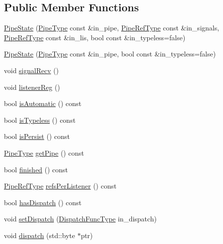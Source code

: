\subsection*{Public Member Functions}
\begin{DoxyCompactItemize}
\item 
\hyperlink{structvt_1_1pipe_1_1_pipe_state_ae243864cd9ea61ddc564b6b3a0870eb4}{Pipe\+State} (\hyperlink{namespacevt_ac9852acda74d1896f48f406cd72c7bd3}{Pipe\+Type} const \&in\+\_\+pipe, \hyperlink{namespacevt_ace18d74dd489d9ea506d38789fffce34}{Pipe\+Ref\+Type} const \&in\+\_\+signals, \hyperlink{namespacevt_ace18d74dd489d9ea506d38789fffce34}{Pipe\+Ref\+Type} const \&in\+\_\+lis, bool const \&in\+\_\+typeless=false)
\item 
\hyperlink{structvt_1_1pipe_1_1_pipe_state_a2f6a2a7f657b0938d0214fc16b65969c}{Pipe\+State} (\hyperlink{namespacevt_ac9852acda74d1896f48f406cd72c7bd3}{Pipe\+Type} const \&in\+\_\+pipe, bool const \&in\+\_\+typeless=false)
\item 
void \hyperlink{structvt_1_1pipe_1_1_pipe_state_a3cd72e7d91b3752e2cb19bc42b7de397}{signal\+Recv} ()
\item 
void \hyperlink{structvt_1_1pipe_1_1_pipe_state_acfbe1dc3cac73153543a394b4f8add35}{listener\+Reg} ()
\item 
bool \hyperlink{structvt_1_1pipe_1_1_pipe_state_ada2a4221edc09264da146ff158e37d3c}{is\+Automatic} () const
\item 
bool \hyperlink{structvt_1_1pipe_1_1_pipe_state_a0e20b860728e1aded738be02074c5861}{is\+Typeless} () const
\item 
bool \hyperlink{structvt_1_1pipe_1_1_pipe_state_a8922ec696ab8a01651a53011a548b067}{is\+Persist} () const
\item 
\hyperlink{namespacevt_ac9852acda74d1896f48f406cd72c7bd3}{Pipe\+Type} \hyperlink{structvt_1_1pipe_1_1_pipe_state_ab69e2e4c5783a5df48087fdb436a7a2f}{get\+Pipe} () const
\item 
bool \hyperlink{structvt_1_1pipe_1_1_pipe_state_a593b2ce5b04ce3e4234654f454868434}{finished} () const
\item 
\hyperlink{namespacevt_ace18d74dd489d9ea506d38789fffce34}{Pipe\+Ref\+Type} \hyperlink{structvt_1_1pipe_1_1_pipe_state_ad7ec2850c900f8359affd00af6d7e0cc}{refs\+Per\+Listener} () const
\item 
bool \hyperlink{structvt_1_1pipe_1_1_pipe_state_adbd64a53d60cfe18a7c9994cf2af901b}{has\+Dispatch} () const
\item 
void \hyperlink{structvt_1_1pipe_1_1_pipe_state_a436083ce72366f0bece034065bb3aca1}{set\+Dispatch} (\hyperlink{structvt_1_1pipe_1_1_pipe_state_aa6d3f6b8d9c1a4d1f261bc563ff99e3e}{Dispatch\+Func\+Type} in\+\_\+dispatch)
\item 
void \hyperlink{structvt_1_1pipe_1_1_pipe_state_a7947d1cdc7d69a855c96d4f878365574}{dispatch} (std\+::byte $\ast$ptr)
\end{DoxyCompactItemize}
